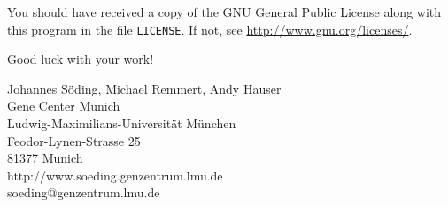 \documentclass[11pt,a4paper]{article}
\begin{document}
You should have received a copy of the GNU General Public License
along with this program in the file \verb`LICENSE`.  
If not, see \url{http://www.gnu.org/licenses/}.


%


 
\vspace{20mm}
\begin{center}
Good luck with your work!

\vspace{5mm}
Johannes S\"oding, Michael Remmert, Andy Hauser\\[2mm]
Gene Center Munich\\
Ludwig-Maximilians-Universit\"at M\"unchen\\
Feodor-Lynen-Strasse 25\\
81377 Munich\\
http://www.soeding.genzentrum.lmu.de\\
soeding@genzentrum.lmu.de
\end{center}
\end{document}

